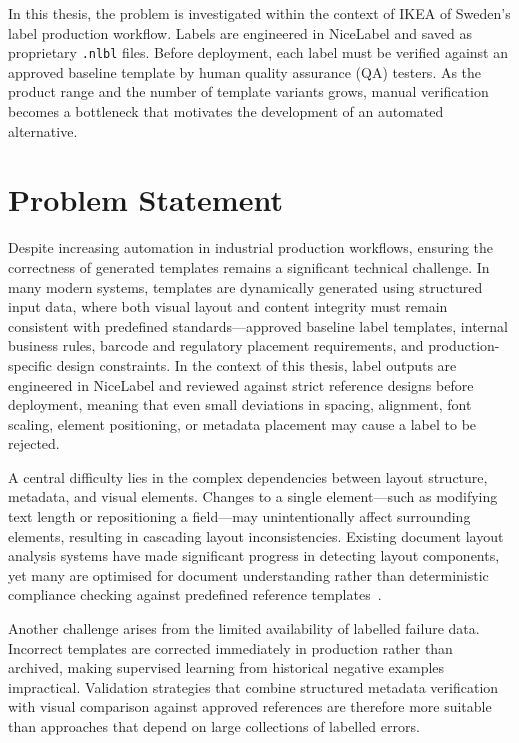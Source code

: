 In this thesis, the problem is investigated within the context of IKEA of Sweden's label
production workflow. Labels are engineered in NiceLabel and saved as proprietary
\texttt{.nlbl} files. Before deployment, each label must be verified against an approved
baseline template by human quality assurance (QA) testers. As the product range and the
number of template variants grows, manual verification becomes a bottleneck that motivates
the development of an automated alternative.

\section{Problem Statement}
\label{sec:problem}

Despite increasing automation in industrial production workflows, ensuring the correctness
of generated templates remains a significant technical challenge. In many modern systems,
templates are dynamically generated using structured input data, where both visual layout
and content integrity must remain consistent with predefined standards—approved baseline
label templates, internal business rules, barcode and regulatory placement requirements,
and production-specific design constraints. In the context of this thesis, label outputs are
engineered in NiceLabel and reviewed against strict reference designs before deployment,
meaning that even small deviations in spacing, alignment, font scaling, element positioning,
or metadata placement may cause a label to be rejected.

A central difficulty lies in the complex dependencies between layout structure, metadata,
and visual elements. Changes to a single element—such as modifying text length or
repositioning a field—may unintentionally affect surrounding elements, resulting in
cascading layout inconsistencies. Existing document layout analysis systems have made
significant progress in detecting layout components, yet many are optimised for document
understanding rather than deterministic compliance checking against predefined reference
templates~\cite{pfitzmann2022doclaynet,shen2021layoutparser}.

Another challenge arises from the limited availability of labelled failure data. Incorrect
templates are corrected immediately in production rather than archived, making supervised
learning from historical negative examples impractical. Validation strategies that combine
structured metadata verification with visual comparison against approved references are
therefore more suitable than approaches that depend on large collections of labelled errors.

